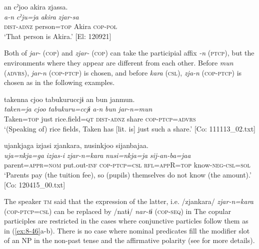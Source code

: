 \ex
{\TM}
\glll  an  cˀjoo  akira  zjassa.\\
\textit{a-n}  \textit{cˀju=ja}  \textit{akira}  \textit{zjar-sa}\\
\textsc{dist}-\textsc{adnz}  person=\textsc{top}  Akira  \textsc{cop}-\textsc{pol}\\
\glt ‘That person is Akira.’ [El: 120921]
\z
\z

Both of \textit{jar-} (\textsc{cop}) and \textit{zjar-} (\textsc{cop}) can take the participial affix \textit{-n} (\textsc{ptcp}), but the environments where they appear are different from each other. Before \textit{mun} (\textsc{advrs}), \textit{jar-n} (\textsc{cop}-\textsc{ptcp}) is chosen, and before \textit{kara} (\textsc{csl}), \textit{zja-n} (\textsc{cop}-\textsc{ptcp}) is chosen as in the following examples.

\ea\label{ex:8-46}
\ea
{\TM}
\glll  takenna  cjoo  tabukuruccjɨ  an  bun  janmun.\\
\textit{taken=ja}  \textit{cjoo}  \textit{tabukuru=ccjɨ}  \textit{a-n}  \textit{bun}  \textit{jar-n=mun}\\
Taken=\textsc{top}  just  rice.field=\textsc{qt}  \textsc{dist}-\textsc{adnz}  share  \textsc{cop}-\textsc{ptcp}=\textsc{advrs}\\
\glt ‘(Speaking of) rice fields, Taken has [lit. is] just such a share.’ [Co: 111113\_02.txt]

\ex
{\TM}
\glll  ujankjaga  izjasi  zjankara,  nusinkjoo      sijanbajaa.\\
\textit{uja=nkja=ga}  \textit{izjas-i}  \textit{zjar-n=kara}  \textit{nusi=nkja=ja}      \textit{sij-an-ba=jaa}\\
parent=\textsc{appr}=\textsc{nom}  put.out-\textsc{inf}  \textsc{cop}-\textsc{ptcp}=\textsc{csl}  \textsc{rfl}=\textsc{app}R=\textsc{top}   know-\textsc{neg}-\textsc{csl}=\textsc{sol}\\
\glt ‘Parents pay (the tuition fee), so (pupils) themselves do not know (the amount).’ [Co: 120415\_00.txt]
\z
\z

The speaker \textsc{tm} said that the expression of the latter, i.e. /zjankara/ \textit{zjar-n=kara} (\textsc{cop}-\textsc{ptcp}=\textsc{csl}) can be replaced by /natɨ/ \textit{nar-tɨ} (\textsc{cop}-\textsc{seq}) in  The copular participles are restricted in the cases where conjunctive particles follow them as in (\ref{ex:8-46}a-b). There is no case where nominal predicates fill the modifier slot of an NP in the non-past tense and the affirmative polarity (see  for more details).

